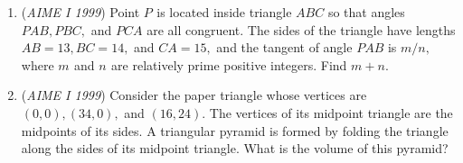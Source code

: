 \begin{enumerate}
	\item (\textit{AIME I 1999}) Point $P_{}$ is located inside triangle $ABC$ so that angles $PAB, PBC,$ and $PCA$ are all congruent.  The sides of the triangle have lengths $AB=13, BC=14,$ and $CA=15,$ and the tangent of angle $PAB$ is $m/n,$ where $m_{}$ and $n_{}$ are relatively prime positive integers.  Find $m+n.$


	\item (\textit{AIME I 1999}) Consider the paper triangle whose vertices are $(0,0), (34,0),$ and $(16,24).$  The vertices of its midpoint triangle are the midpoints of its sides.  A triangular pyramid is formed by folding the triangle along the sides of its midpoint triangle.  What is the volume of this pyramid?


 

\end{enumerate}